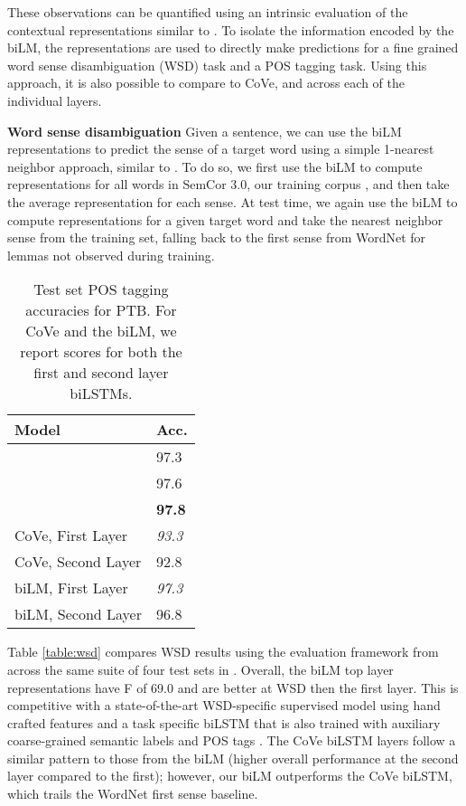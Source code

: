 \documentclass[11pt,a4paper]{article}
\newcommand{\tinysection}[1]{\textbf{#1}}
\begin{document}
These observations can be quantified using an intrinsic evaluation of the contextual representations similar to \citet{Belinkov2017WhatDN}.
To isolate the information encoded by the biLM, the representations are used to directly make predictions for
a fine grained word sense disambiguation (WSD) task and a POS tagging task.
Using this approach, it is also possible to compare to CoVe, and across each of the individual layers.

\tinysection{Word sense disambiguation}
Given a sentence, we can use the biLM representations to predict the sense of a target word using a simple 1-nearest neighbor approach, similar to \citet{Melamud2016context2vecLG}.
To do so, we first use the biLM to compute representations for all words in SemCor 3.0, our training corpus \citep{Miller1994UsingAS}, and then take the average representation for each sense.
At test time, we again use the biLM to compute representations for a given target word and take the nearest neighbor sense from the training set, falling back to the first sense from WordNet for lemmas not observed during training.

\begin{table}
\centering
\label{table:pos}
\begin{tabular}{l|l}
 \textbf{Model} & \textbf{Acc.} \\ \hline \hline
\citet{NLPfromScratch:Collobert2011} & 97.3 \\
\citet{Ma2016EndtoendSL} & 97.6 \\
\citet{Ling2015FindingFI} & \textbf{97.8} \\ \hline
CoVe, First Layer  & \textit{93.3} \\
CoVe, Second Layer  & 92.8 \\ \hline
biLM, First Layer  & \textit{97.3} \\
biLM, Second Layer  &  96.8
\end{tabular}
\caption{Test set POS tagging accuracies for PTB.
For CoVe and the biLM, we report scores for both the first and second layer biLSTMs.}
\end{table}



Table \ref{table:wsd} compares WSD results using the evaluation framework from \citet{Raganato2017WordSD} across the same suite of four test sets in \citet{Raganato2017NeuralSL}.
Overall, the biLM top layer representations have F of 69.0 and are better at WSD then the first layer.
This is competitive with a state-of-the-art WSD-specific supervised model using hand crafted features \citep{Iacobacci2016EmbeddingsFW} and a task specific biLSTM that is also trained with auxiliary coarse-grained semantic labels and POS tags \citep{Raganato2017NeuralSL}.
The CoVe biLSTM layers follow a similar pattern to those from the biLM (higher overall performance at the second layer compared to the first); however, our biLM outperforms the CoVe biLSTM, which trails the WordNet first sense baseline.
\end{document}
